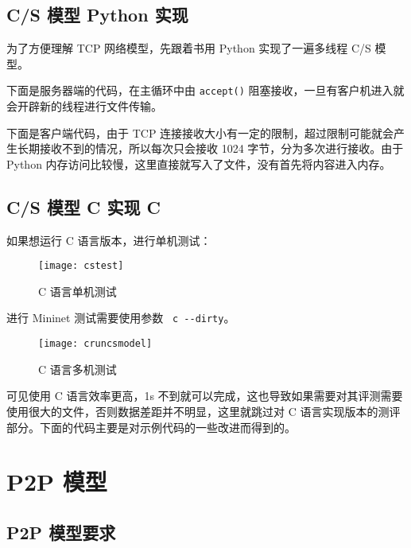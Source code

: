 
\subsection{C/S 模型 Python 实现 \faPython}

为了方便理解 TCP 网络模型，先跟着书用 Python 实现了一遍多线程 C/S 模型。

下面是服务器端的代码，在主循环中由 \verb"accept()" 阻塞接收，一旦有客户机进入就会开辟新的线程进行文件传输。


下面是客户端代码，由于 TCP 连接接收大小有一定的限制，超过限制可能就会产生长期接收不到的情况，所以每次只会接收 1024 字节，分为多次进行接收。由于 Python 内存访问比较慢，这里直接就写入了文件，没有首先将内容进入内存。


\subsection{C/S 模型 C 实现 \textsf{C}}

如果想运行 C 语言版本，进行单机测试：
\begin{figure}[H]
    \centering
    \texttt{[image: cstest]}
    \caption{C 语言单机测试}
\end{figure}

进行 Mininet 测试需要使用参数 \verb" c --dirty"。

\begin{figure}[H]
    \centering
    \texttt{[image: cruncsmodel]}
    \caption{C 语言多机测试}
\end{figure}

可见使用 C 语言效率更高，1s 不到就可以完成，这也导致如果需要对其评测需要使用很大的文件，否则数据差距并不明显，这里就跳过对 C 语言实现版本的测评部分。下面的代码主要是对示例代码的一些改进而得到的。



\section{P2P 模型}

\subsection{P2P 模型要求}


